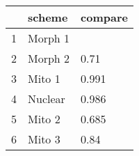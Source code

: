 \begin{table}[ht]
\centering
\begin{tabular}{rll}
  \hline
 & scheme & compare \\ 
  \hline
1 & Morph 1 &  \\ 
  2 & Morph 2 & 0.71 \\ 
  3 & Mito 1 & 0.991 \\ 
  4 & Nuclear & 0.986 \\ 
  5 & Mito 2 & 0.685 \\ 
  6 & Mito 3 & 0.84 \\ 
   \hline
\end{tabular}
\label{lldif}
\end{table}
